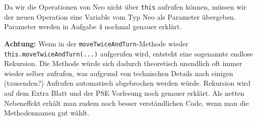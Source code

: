 \begin{Infobox}
Da wir die Operationen von Neo nicht über \lstinline{this} aufrufen können, müssen wir der neuen Operation eine Variable vom Typ Neo als Parameter übergeben.
Parameter werden in Aufgabe 4 nochmal genauer erklärt.\newline

\textbf{Achtung:} Wenn in der \lstinline{moveTwiceAndTurn}-Methode wieder \lstinline{this.moveTwiceAndTurn(...)} aufgerufen wird, entsteht eine sogenannte endlose Rekursion.
Die Methode würde sich dadurch theoretisch unendlich oft immer wieder selber aufrufen, was aufgrund von technischen Details nach einigen (tausenden?) Aufrufen automatisch abgebrochen werden würde.
Rekursion wird auf dem Extra Blatt und der PSE Vorlesung noch genauer erklärt. Als netten Nebeneffekt erhält man zudem noch besser verständlichen Code, wenn man die Methodennamen gut wählt.

\end{Infobox}


